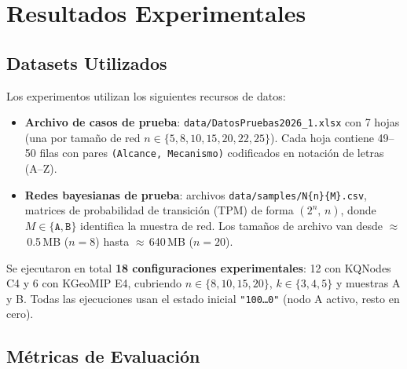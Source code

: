 
\section{Resultados Experimentales}

\subsection{Datasets Utilizados}

Los experimentos utilizan los siguientes recursos de datos:

\begin{itemize}
  \item \textbf{Archivo de casos de prueba}: \texttt{data/DatosPruebas2026\_1.xlsx}
        con 7 hojas (una por tamaño de red $n \in \{5,8,10,15,20,22,25\}$).
        Cada hoja contiene 49--50 filas con pares \texttt{(Alcance, Mecanismo)}
        codificados en notación de letras (A--Z).

  \item \textbf{Redes bayesianas de prueba}: archivos
        \texttt{data/samples/N\{n\}\{M\}.csv}, matrices de probabilidad de
        transición (TPM) de forma $(2^n,\, n)$, donde $M \in \{\texttt{A},
        \texttt{B}\}$ identifica la muestra de red.
        Los tamaños de archivo van desde $\approx$\,0.5\,MB ($n=8$)
        hasta $\approx$\,640\,MB ($n=20$).
\end{itemize}

Se ejecutaron en total \textbf{18 configuraciones experimentales}: 12 con
KQNodes C4 y 6 con KGeoMIP E4, cubriendo $n \in \{8,10,15,20\}$,
$k \in \{3,4,5\}$ y muestras A y B.
Todas las ejecuciones usan el estado inicial \texttt{"100\ldots0"}
(nodo A activo, resto en cero).

\subsection{Métricas de Evaluación}

